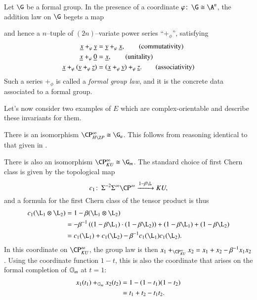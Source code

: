 \begin{definition}\label{FGLDefinition}
Let $\G$ be a formal group.  In the presence of a coordinate $\phi \co \G \cong \A^n$, the addition law on $\G$ begets a map
\begin{center}
\end{center}
and hence a $n$--tuple of $(2n)$--variate power series ``$+_\phi$'', satisfying
\begin{align*}
\underline{\smash x} +_\phi \underline{\smash y} & = \underline{\smash y} +_\phi \underline{\smash x}, \tag{commutativity} \\
\underline{\smash x} +_\phi \underline{\smash 0} & = \underline{\smash x}, \tag{unitality} \\
\underline{\smash x} +_\phi (\underline{\smash y} +_\phi \underline{\smash z}) & = (\underline{\smash x} +_\phi \underline{\smash y}) +_\phi \underline{\smash z}. \tag{associativity}
\end{align*}
Such a series $+_\phi$ is called a \textit{formal group law}, and it is the concrete data associated to a formal group.
\end{definition}

Let's now consider two examples of $E$ which are complex-orientable and describe these invariants for them.

\begin{example}\label{HZGivesGa}
There is an isomorphism $\CP^\infty_{H\Z P} \cong \G_a$.  This follows from reasoning identical to that given in .
\end{example}

\begin{example}\label{CPinftyKUExample}
There is also an isomorphism $\CP^\infty_{KU} \cong \G_m$.  The standard choice of first Chern class is given by the topological map \[c_1\co \Susp^{-2} \Susp^\infty \CP^\infty \xrightarrow{1 - \beta \L} KU,\] and a formula for the first Chern class of the tensor product is thus
\begin{align*}
c_1(\L_1 \otimes \L_2) & = 1 - \beta(\L_1 \otimes \L_2) \\
& = -\beta^{-1} \left( (1 - \beta \L_1) \cdot (1 - \beta \L_2) \right) + (1 - \beta \L_1) + (1 - \beta \L_2) \\
& = c_1(\L_1) + c_1(\L_2) - \beta^{-1} c_1(\L_1) c_1(\L_2).
\end{align*}
In this coordinate on $\CP^\infty_{KU}$, the group law is then $x_1 +_{\CP^\infty_{KU}} x_2 = x_1 + x_2 - \beta^{-1} x_1 x_2$.  Using the coordinate function $1 - t$, this is also the coordinate that arises on the formal completion of $\Gm$ at $t = 1$:
\begin{align*}
x_1(t_1) +_{\Gm} x_2(t_2) & = 1 - (1 - t_1)(1 - t_2) \\
& = t_1 + t_2 - t_1 t_2.
\end{align*}
\end{example}

